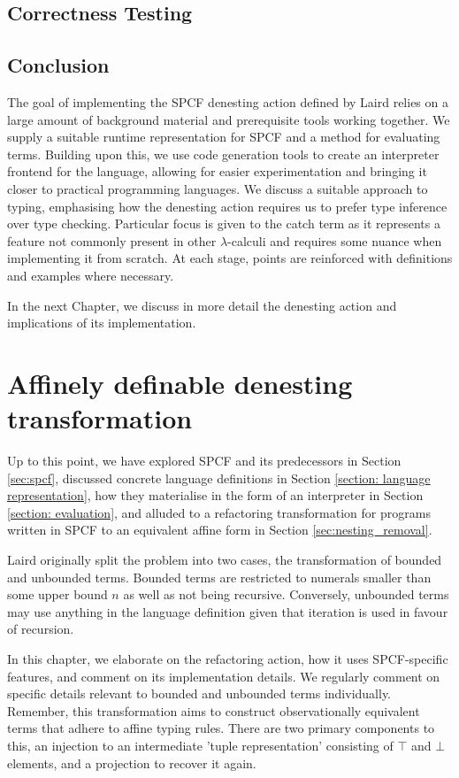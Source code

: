 \documentclass[12pt,a4paper]{report}
\theoremstyle{definition}
\theoremstyle{remark}
\begin{document}
\section{Correctness Testing}


\section{Conclusion}
The goal of implementing the SPCF denesting action defined by Laird relies on a large amount of background material and prerequisite tools working together. We supply a suitable runtime representation for SPCF and a method for evaluating terms. Building upon this, we use code generation tools to create an interpreter frontend for the language, allowing for easier experimentation and bringing it closer to practical programming languages. We discuss a suitable approach to typing, emphasising how the denesting action requires us to prefer type inference over type checking. Particular focus is given to the catch term as it represents a feature not commonly present in other $\lambda$-calculi and requires some nuance when implementing it from scratch. At each stage, points are reinforced with definitions and examples where necessary.

In the next Chapter, we discuss in more detail the denesting action and implications of its implementation.

\chapter{Affinely definable denesting transformation}\label{chapter: denesting}
Up to this point, we have explored SPCF and its predecessors in Section \ref{sec:spcf}, discussed concrete language definitions in Section \ref{section: language representation}, how they materialise in the form of an interpreter in Section \ref{section: evaluation}, and alluded to a refactoring transformation for programs written in SPCF to an equivalent affine form in Section \ref{sec:nesting_removal}. 

Laird originally split the problem into two cases, the transformation of bounded and unbounded terms. Bounded terms are restricted to numerals smaller than some upper bound $n$ as well as not being recursive. Conversely, unbounded terms may use anything in the language definition given that iteration is used in favour of recursion.

In this chapter, we elaborate on the refactoring action, how it uses SPCF-specific features, and comment on its implementation details. We regularly comment on specific details relevant to bounded and unbounded terms individually. Remember, this transformation aims to construct observationally equivalent terms that adhere to affine typing rules. There are two primary components to this, an injection to an intermediate 'tuple representation' consisting of $\top$ and $\bot$ elements, and a projection to recover it again.
\end{document}
